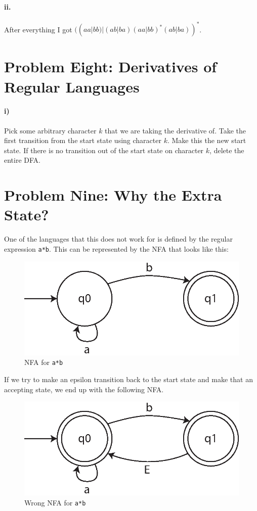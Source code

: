 \documentclass[10pt,letter]{article}
\begin{document}
\paragraph{ii.} After everything I got $( (aa|bb) | (ab|ba) (aa|bb)^* (ab|ba))^*$.

\section*{Problem Eight: Derivatives of Regular Languages}

\paragraph{i)} Pick some arbitrary character $k$ that we are taking the derivative of. Take the first transition from the start state using character $k$. Make this the new start state. If there is no transition out of the start state on character $k$, delete the entire DFA.


\section*{Problem Nine: Why the Extra State?} 
One of the languages that this does not work for is defined by the regular expression \texttt{a*b}. This can be represented by the NFA that looks like this:

\begin{figure}[h]
\centering
  \includegraphics[width=0.45\linewidth]{9i.eps}
  \caption{NFA for \texttt{a*b}}
  \label{fig:9i}
\end{figure}

If we try to make an epsilon transition back to the start state and make that an accepting state, we end up with the following NFA.

\begin{figure}[h]
\centering
  \includegraphics[width=0.45\linewidth]{9ii.eps}
  \caption{Wrong NFA for \texttt{a*b}}
  \label{fig:9ii}
\end{figure}
\end{document}
